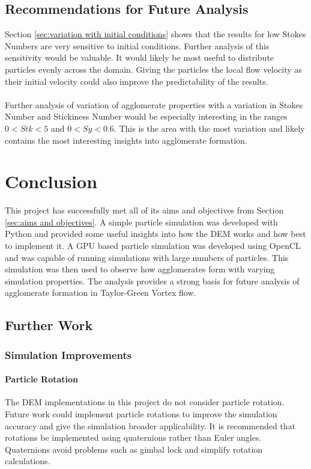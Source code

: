 \documentclass[a4paper,11pt,titlepage]{report}
\begin{document}
\section{Recommendations for Future Analysis}
Section \ref{sec:variation with initial conditions} shows that the results for low Stokes Numbers are very sensitive to initial conditions. Further analysis of this sensitivity would be valuable. It would likely be most useful to distribute particles evenly across the domain. Giving the particles the local flow velocity as their initial velocity could also improve the predictability of the results.
\\\\Further analysis of variation of agglomerate properties with a variation in Stokes Number and Stickiness Number would be especially interesting in the ranges $0 < Stk < 5$ and $0 < Sy < 0.6$. This is the area with the most variation and likely contains the most interesting insights into agglomerate formation.
\chapter{Conclusion}
This project has successfully met all of its aims and objectives from Section \ref{sec:aims and objectives}. A simple particle simulation was developed with Python and provided some useful insights into how the DEM works and how best to implement it. A GPU based particle simulation was developed using OpenCL and was capable of running simulations with large numbers of particles. This simulation was then used to observe how agglomerates form with varying simulation properties. The analysis provides a strong basis for future analysis of agglomerate formation in Taylor-Green Vortex flow.
\section{Further Work}
\subsection{Simulation Improvements}
\subsubsection{Particle Rotation}
The DEM implementations in this project do not consider particle rotation. Future work could implement particle rotations to improve the simulation accuracy and give the simulation broader applicability. It is recommended that rotations be implemented using quaternions rather than Euler angles. Quaternions avoid problems such as gimbal lock and simplify rotation calculations.
\end{document}
